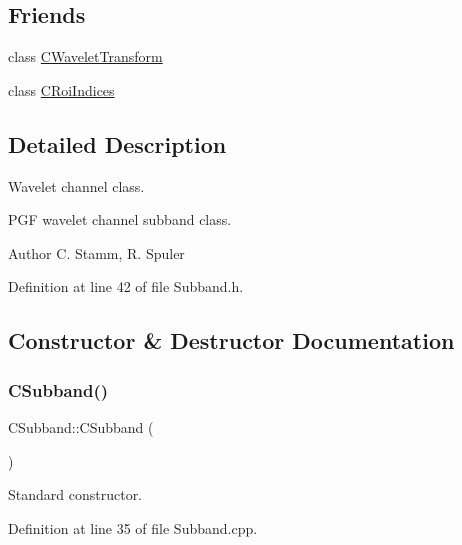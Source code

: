 \subsection*{Friends}
\begin{DoxyCompactItemize}
\item 
class \mbox{\hyperlink{classCSubband_a30d2cc4fc1b1060bf29a6576d926a615}{C\+Wavelet\+Transform}}
\item 
class \mbox{\hyperlink{classCSubband_a12f1d468e72e4621ac470795f8a9aee4}{C\+Roi\+Indices}}
\end{DoxyCompactItemize}


\subsection{Detailed Description}
Wavelet channel class. 

P\+GF wavelet channel subband class. \begin{DoxyAuthor}{Author}
C. Stamm, R. Spuler 
\end{DoxyAuthor}


Definition at line 42 of file Subband.\+h.



\subsection{Constructor \& Destructor Documentation}
\mbox{\label{classCSubband_afa9c10af42bd47d2b001e90dfd1031b5}} 
\subsubsection{\texorpdfstring{CSubband()}{CSubband()}}
{\footnotesize\ttfamily C\+Subband\+::\+C\+Subband (\begin{DoxyParamCaption}{ }\end{DoxyParamCaption})}



Standard constructor. 



Definition at line 35 of file Subband.\+cpp.


